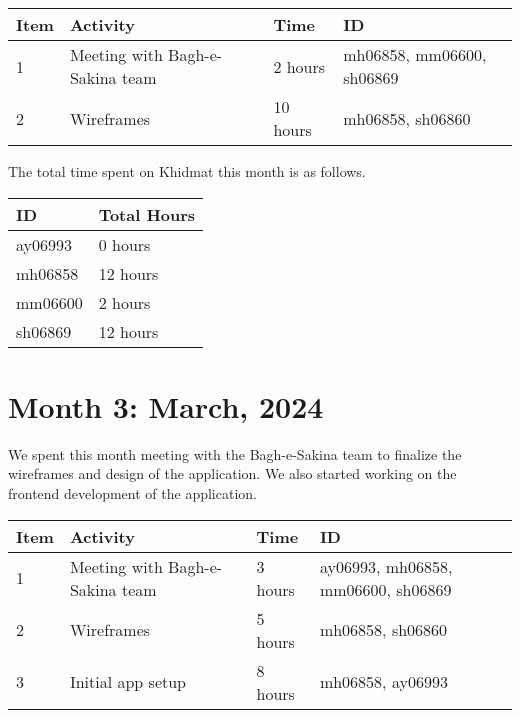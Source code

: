 \documentclass{article}
\begin{document}
\vspace{1em}

\noindent \begin{tabular}{|l|l|l|l|}
  \hline
  Item & Activity & Time   & ID                        \\\hline
  1    & Meeting with Bagh-e-Sakina team & 2 hours   & mh06858, mm06600, sh06869 \\\hline
  2    & Wireframes   & 10 hours & mh06858, sh06860          \\\hline
\end{tabular}

\vspace{1em}

\noindent The total time spent on Khidmat this month is as follows.

\vspace{1em}

\noindent \begin{tabular}{|l|l|}
  \hline
  ID      & Total Hours \\ \hline
  ay06993 & 0 hours     \\ \hline
  mh06858 & 12 hours    \\ \hline
  mm06600 & 2 hours     \\ \hline
  sh06869 & 12 hours    \\ \hline
\end{tabular}

\newpage %
\section*{Month 3: March, 2024}

We spent this month meeting with the Bagh-e-Sakina team to finalize the wireframes and design of the application. We also started working on the frontend development of the application.

\vspace{1em}

\noindent \begin{tabular}{|l|l|l|l|}
  \hline
  Item & Activity & Time & ID \\ \hline
  1 & Meeting with Bagh-e-Sakina team  & 3 hours & ay06993, mh06858, mm06600, sh06869 \\ \hline
  2 & Wireframes & 5 hours & mh06858, sh06860 \\ \hline
  3 & Initial app setup & 8 hours & mh06858, ay06993 \\ \hline
\end{tabular}
\end{document}

